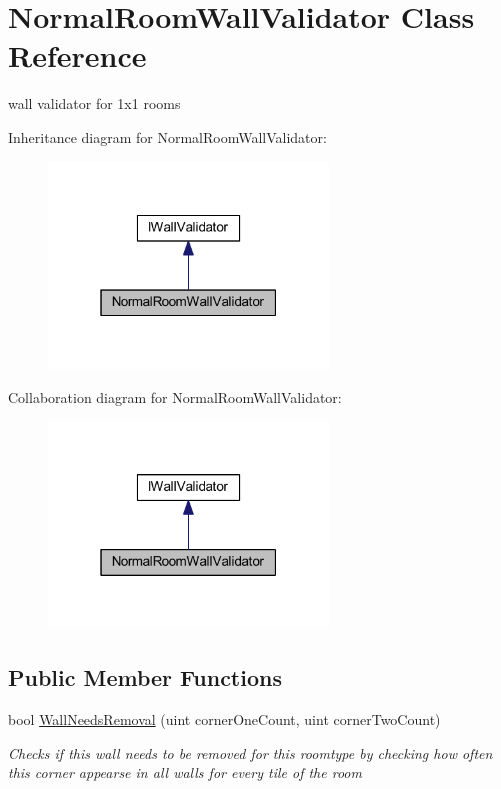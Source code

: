 \hypertarget{class_normal_room_wall_validator}{}\section{Normal\+Room\+Wall\+Validator Class Reference}
\label{class_normal_room_wall_validator}


wall validator for 1x1 rooms  




Inheritance diagram for Normal\+Room\+Wall\+Validator\+:
\nopagebreak
\begin{figure}[H]
\begin{center}
\leavevmode
\includegraphics[width=211pt]{class_normal_room_wall_validator__inherit__graph}
\end{center}
\end{figure}


Collaboration diagram for Normal\+Room\+Wall\+Validator\+:
\nopagebreak
\begin{figure}[H]
\begin{center}
\leavevmode
\includegraphics[width=211pt]{class_normal_room_wall_validator__coll__graph}
\end{center}
\end{figure}
\subsection*{Public Member Functions}
\begin{DoxyCompactItemize}
\item 
bool \mbox{\hyperlink{class_normal_room_wall_validator_a30c0496c8203077f3c327da93f38f7c7}{Wall\+Needs\+Removal}} (uint corner\+One\+Count, uint corner\+Two\+Count)
\begin{DoxyCompactList}\small\item\em Checks if this wall needs to be removed for this roomtype by checking how often this corner appearse in all walls for every tile of the room \end{DoxyCompactList}\end{DoxyCompactItemize}


